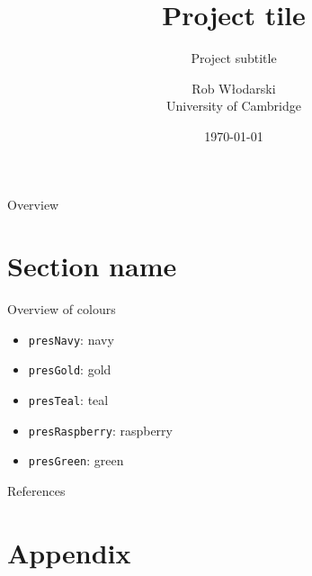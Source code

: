 \documentclass[aspectratio=169,t,11pt,table,leqno]{beamer}
\title{Project tile}
\subtitle{Project subtitle}
\date{\today}
\author{Rob Włodarski \\ University of Cambridge}
\newcommand{\sectionnote}{}
\begin{document}

\begin{frame}
  \maketitle
\end{frame}

\begin{frame}{Overview}
  \tableofcontents
\end{frame}


\section{Section name}
\begin{frame}{Overview of colours}

  \begin{itemize}
    \item \texttt{presNavy}: \textcolor{presNavy}{navy}
    \item \texttt{presGold}: \textcolor{presGold}{gold}
    \item \texttt{presTeal}: \textcolor{presTeal}{teal} 
    \item \texttt{presRaspberry}: \textcolor{presRaspberry}{raspberry} 
    \item \texttt{presGreen}: \textcolor{presGreen}{green} 
  \end{itemize}
  
\end{frame}
\begin{frame}{References}
  \thispagestyle{empty}
  \printbibliography
\end{frame}

\appendix


\renewcommand{\sectionnote}{Empirics}
\section{Appendix}
\end{document}
